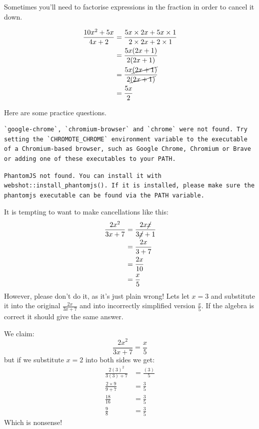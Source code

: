 \documentclass[
  a4paper,
]{scrbook}
\begin{document}
Sometimes you'll need to factorise expressions in the fraction in order
to cancel it down.

\[
\begin{aligned} \frac{10x^2 + 5x}{4x+2} &= \frac{5x \times 2x + 5x \times 1}{2 \times 2x + 2 \times 1} \\
&= \frac{5x(2x+1)}{2(2x+1)} \\
&= \frac{5x\cancel{(2x+1)}}{2\cancel{(2x+1)}} \\
&= \frac{5x}{2}
\end{aligned}
\]

Here are some practice questions.

\begin{verbatim}
`google-chrome`, `chromium-browser` and `chrome` were not found. Try setting the `CHROMOTE_CHROME` environment variable to the executable of a Chromium-based browser, such as Google Chrome, Chromium or Brave or adding one of these executables to your PATH.
\end{verbatim}

\begin{verbatim}
PhantomJS not found. You can install it with webshot::install_phantomjs(). If it is installed, please make sure the phantomjs executable can be found via the PATH variable.
\end{verbatim}

\begin{tcolorbox}[enhanced jigsaw, arc=.35mm, bottomrule=.15mm, bottomtitle=1mm, breakable, colback=white, colbacktitle=quarto-callout-important-color!10!white, colframe=quarto-callout-important-color-frame, coltitle=black, left=2mm, leftrule=.75mm, opacityback=0, opacitybacktitle=0.6, rightrule=.15mm, title=\textcolor{quarto-callout-important-color}{\faExclamation}\hspace{0.5em}{Warning!}, titlerule=0mm, toprule=.15mm, toptitle=1mm]

It is tempting to want to make cancellations like this: \[
\begin{aligned} \frac{2x^2}{3x+7} &= \frac{2x\cancel{x}}{3\cancel{x}+1} \\
&= \frac{2x}{3+7} \\
&= \frac{2x}{10} \\
&= \frac{x}{5}
\end{aligned}
\] However, please don't do it, as it's just plain wrong! Lets let
\(x=3\) and substitute it into the original \(\frac{2x}{3x+7}\) and into
incorrectly simplified version \(\frac{x}{5}\). If the algebra is
correct it should give the same answer.

We claim: \[
\frac{2x^2}{3x+7} = \frac{x}{5}
\] but if we substitute \(x=2\) into both sides we get: \[
\begin{aligned} \frac{2(3)^2}{3(3)+7} &= \frac{(3)}{5} \\
\frac{2 \times 9}{9+7} &= \frac{3}{5} \\
\frac{18}{16} &= \frac{3}{5} \\
\frac{9}{8} &= \frac{3}{5}
\end{aligned}
\] Which is nonsense!

\end{tcolorbox}
\end{document}
